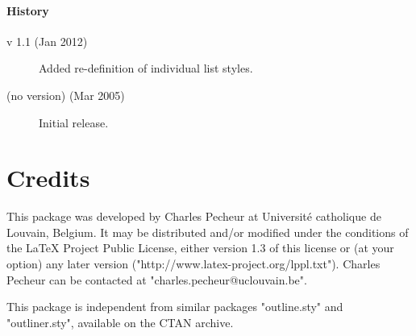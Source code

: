 \documentclass[11pt]{article}
\begin{document}
\paragraph{History}

\begin{description}

	\item[v 1.1 (Jan 2012)] Added re-definition of individual list styles.
	
	\item[(no version) (Mar 2005)] Initial release.
	
\end{description}	

\section{Credits}

This package was developed by Charles Pecheur at Universit\'e catholique de Louvain, Belgium. It may be distributed and/or modified under the conditions of the LaTeX Project Public License, either version 1.3 of this license or (at your option) any later version ("http://www.latex-project.org/lppl.txt"). Charles Pecheur can be contacted at "charles.pecheur@uclouvain.be".

This package is independent from similar packages "outline.sty" and "outliner.sty", available on the CTAN archive.
\end{document}
